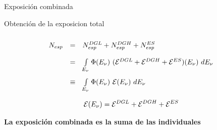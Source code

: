\begin{frame}{Exposici\'on combinada}
	\begin{block}{Obtenci\'on de la exposicion total}
		\begin{center}
			\begin{displaymath}\renewcommand{\arraystretch}{2}
			\begin{array}{rcl}
			N_{esp}& =& N_{esp}^{DGL}+N_{esp}^{DGH}+N_{esp}^{ES} \\ 
			& = & \int\limits_{E_\nu}\Phi(E_\nu)~({\cal E}^{DGL}+{\cal E}^{DGH}+{\cal E}^{ES})(E_\nu)~dE_\nu\\
			& \equiv & \int\limits_{E_\nu}\Phi(E_\nu)~{\cal E}(E_\nu)~dE_\nu
			\end{array}
			\end{displaymath}
		\end{center}
	\end{block}
	
	\begin{alertblock}{}
	\centering
			\begin{displaymath}
			{\cal E}(E_\nu) = {\cal E}^{DGL}+{\cal E}^{DGH}+{\cal E}^{ES}
			\end{displaymath}
	\end{alertblock}
	
	\begin{exampleblock}{}
		\begin{center}
			\textbf{La exposici\'on combinada es la suma de las individuales}
		\end{center}
	\end{exampleblock}
\end{frame}

